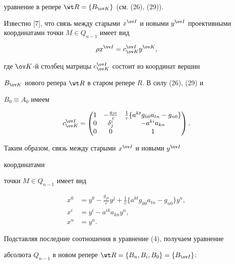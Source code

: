 уравнение в репере $\wt R=\{B_{\ov K}\}$ (см. (26), (29)). 


 


Известно [7], что связь между старыми $x^{\ov I}$ и новыми $y^{\ov 


I}$ проективными координатами точки $M\in Q_{n-1}$ имеет вид 


$$ 


\rho x^{\ov I}=c^{\ov I}_{\ov K}y^{\ov K}, 


$$ 


где $\ov K$-й столбец матрицы $c^{\ov I}_{\ov K}$ состоит из координат вершин 


$B_{\ov K}$ нового репера $\wt R$ в старом репере $R$. В силу (26), (29) и 


$B_0\equiv A_0$ имеем 


$$ 


c^{\ov I}_{\ov K}= 


\begin{pmatrix} 


1 & -\frac{g_{j0}}{c}& \frac{1}{c}\{a^{kt}g_{k0}a_{tn}-g_{n0}\}\\ 


0 & \delta^i_j & -a^{ki}a_{kn}\\ 


0 & 0 & 1 


\end{pmatrix}. 


$$ 


 


Таким образом, связь между старыми $x^{\ov I}$ и новыми $y^{\ov I}$ 


координатами 


точки $M\in Q_{n-1}$ имеет вид 


\begin{align*} 


x^0&=y^0-\frac{g_{j0}}{c}y^j+\frac{1}{c}\{a^{kt}g_{k0} 


a_{tn}-g_{n0}\}y^n,\\ 


x^i&=y^i-a^{ik}a_{kn}y^n,\\ 


x^n&=y^n. 


\end{align*} 


Подставляя последние соотношения в уравнение (4), получаем уравнение 


абсолюта $Q_{n-1}$ в новом репере $\wt R=\{B_n,B_i,B_0\}=\{B_{\ov I}\}$: 


